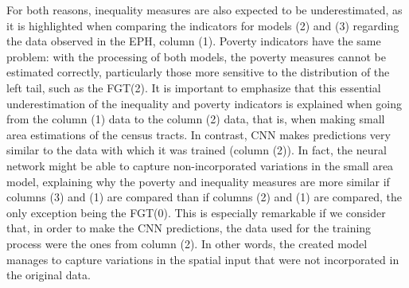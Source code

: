 \documentclass[conference]{IEEEtran}
\begin{document}
For both reasons, inequality measures are also expected to be underestimated, as it is highlighted when comparing the indicators for models (2) and (3) regarding the data observed in the EPH, column (1). Poverty indicators have the same problem: with the processing of both models, the poverty measures cannot be estimated correctly, particularly those more sensitive to the distribution of the left tail, such as the FGT(2). It is important to emphasize that this essential underestimation of the inequality and poverty indicators is explained when going from the column (1) data to the column (2) data, that is, when making small area estimations of the census tracts. In contrast, CNN makes predictions very similar to the data with which it was trained (column (2)). In fact, the neural network might be able to capture non-incorporated variations in the small area model, explaining why the poverty and inequality measures are more similar if columns (3) and (1) are compared than if columns (2) and (1) are compared, the only exception being the FGT(0). This is especially remarkable if we consider that, in order to make the CNN predictions, the data used for the training process were the ones from column (2). In other words, the created model manages to capture variations in the spatial input that were not incorporated in the original data.
\end{document}
